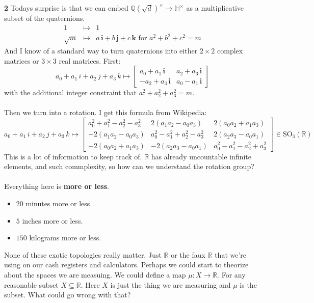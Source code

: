 \documentclass[12pt]{article}
\begin{document}
\textbf{2} Todays surprise is that we can embed $\mathbb{Q}(\sqrt{d})^\times \to \mathbb{H}^\times$ as a multiplicative subset of the quaternions. 
\begin{eqnarray*}
1 &\mapsto& 1 \\
\sqrt{m} &\mapsto& a \,\mathbf{i} + b \,\mathbf{j}+c\,\mathbf{k} \text{ for }a^2 + b^2 + c^2 = m
\end{eqnarray*}
And I know of a standard way to turn quaternions into either $2 \times 2$ complex matrices or $3 \times 3$ real matrices.  First:
$$ a_0 + a_1 \, i + a_2 \, j + a_3 \, k \mapsto \left[ 
\begin{array}{rr} a_0 + a_1 \, \textbf{i} & a_2 + a_3 \, \textbf{i} \\
- a_2 + a_3 \, \textbf{i} & a_0 - a_1 \, \textbf{i} \end{array}\right]$$
with the additional integer constraint that $a_1^2 + a_2^2 + a_3^2 = m$. \\ \\
Then we turn into a rotation. I get this formula from Wikipedia:
$$a_0 + a_1 \, i + a_2 \, j + a_3 \, k
\mapsto \left[ \begin{array}{cccc}
a_0^2 + a_1^2 - a_2^2 - a_3^2 & 2(a_1 a_2 - a_0 a_3) & 2(a_0 a_2 + a_1 a_3) \\
-2(a_1 a_2 - a_0 a_3) & a_0^2 - a_1^2 + a_2^2 - a_3^2 & 2(a_2 a_3 - a_0 a_1) \\
-2(a_0 a_2 + a_1 a_3) & -2(a_2 a_3 - a_0 a_1) & a_0^2 - a_1^2 - a_2^2 + a_3^2 \end{array} \right] \in \text{SO}_3(\mathbb{R}) $$
This is a lot of information to keep track of.  $\mathbb{R}$ has already uncountable infinite elements, and such commplexity, so how can we understand the rotation group? \\ \\
Everything here is \textbf{more or less}.  
\begin{itemize}
\item $20$ minutes more or less
\item $5$ inches more or less.  
\item $150$ kilograms more or less.
\end{itemize}
None of these exotic topologies really matter.  Just $\mathbb{R}$ or the faux $\mathbb{R}$ that we're using on our cash registers and calculators.
  Perhaps we could start to theorize about the spaces we are measuing.  We could define a map $ \mu: X \to \mathbb{R}$.  For any reasonable subset $X \subseteq \mathbb{R}$.  Here $X$ is just the thing we are measuring and $\mu$ is the subset.  What could go wrong with that? 
\end{document}
